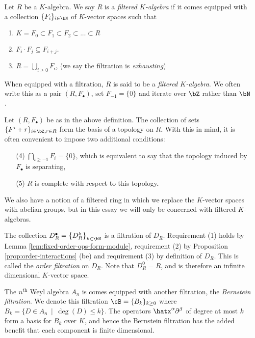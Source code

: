 \begin{defn}\label{defn:filtered-ring}
	Let $R$ be a $K$-algebra. We say $R$ is a \emph{filtered $K$-algebra} if it comes equipped with a collection $\{F_i\}_{i \in \bN}$ of $K$-vector spaces such that
	\begin{enumerate}[(1)]
		\item $K = F_0 \subset F_1 \subset F_2 \subset...\subset R$
		\item $F_i\cdot F_j \subseteq F_{i+j}$.
		\item $R = \bigcup_{i\geq 0} F_i$, (we say the filtration is \emph{exhausting})
	\end{enumerate}
	When equipped with a filtration, $R$ is said to be a \emph{filtered $K$-algebra}. We often write this as a pair $(R,F_\bullet)$, set $F_{-1} = \{0\}$ and iterate over $\bZ$ rather than $\bN$.
\end{defn}
\begin{rmk}\label{rmk:filtration-def-extension}
	Let $(R,F_\bullet)$ be as in the above definition. The collection of sets $\{F^i + r\}_{i \in \bZ, r\in R}$ form the basis of a topology on $R$. With this in mind, it is often convenient to impose two additional conditions:
	\begin{enumerate}[(1)]
		\item[(4)] $\bigcap_{i\geq -1}F_i = \{0\}$, which is equivalent to say that the topology induced by $F_\bullet$ is separating,
		\item[(5)] $R$ is complete with respect to this topology.
	\end{enumerate}
\end{rmk}
We also have a notion of a filtered ring in which we replace the $K$-vector spaces with abelian groups, but in this essay we will only be concerned with filtered $K$-algebras.
\begin{example}\label{example:order-filtration}
	The collection $D^\bullet_{R} = \left\{D^k_{R}\right\}_{k\in \bN}$ is a filtration of $D_{R}$. Requirement (1) holds by Lemma \ref{lem:fixed-order-ops-form-module}, requirement (2) by Proposition \ref{prop:order-interactions} (be) and requirement (3) by definition of $D_{R}$. This is called the \emph{order filtration} on $D_{R}$. Note that $D_R^0 = R$, and is therefore an infinite dimensional $K$-vector space.
\end{example}
\begin{example}\label{example:bernstein-filtration}
	The $n^{\text{th}}$ Weyl algebra $A_n$ is comes equipped with another filtration, the \emph{Bernstein filtration}. We denote this filtration $\cB = \{B_k\}_{k\geq 0}$ where $B_k = \{D \in A_n ~\mid~ \deg(D) \leq k\}$. The operators $\hatx^\alpha\partial^\beta$ of degree at most $k$ form a basis for $B_k$ over $K$, and hence the Bernstein filtration has the added benefit that each component is finite dimensional.
\end{example}
